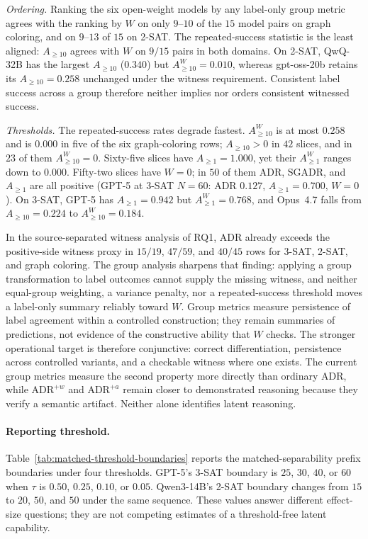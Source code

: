 \documentclass[acmsmall,screen,review,anonymous]{acmart}
\providecommand{\ADRw}{\mathrm{ADR}^{+w}}
\providecommand{\ADRa}{\mathrm{ADR}^{+a}}
\begin{document}
\emph{Ordering.} Ranking the six open-weight models by any label-only group
metric agrees with the ranking by \(W\) on only \(9\)--\(10\) of the \(15\)
model pairs on graph coloring, and on \(9\)--\(13\) of \(15\) on 2-SAT. The
repeated-success statistic is the least aligned: \(A_{\ge10}\) agrees with
\(W\) on \(9/15\) pairs in both domains. On 2-SAT, QwQ-32B has the largest
\(A_{\ge10}\) (\(0.340\)) but \(A^{W}_{\ge10}=0.010\), whereas gpt-oss-20b
retains its \(A_{\ge10}=0.258\) unchanged under the witness requirement.
Consistent label success across a group therefore neither implies nor orders
consistent witnessed success.

\emph{Thresholds.} The repeated-success rates degrade fastest.
\(A^{W}_{\ge10}\) is at most \(0.258\) and is \(0.000\) in five of the six
graph-coloring rows; \(A_{\ge10}>0\) in \(42\) slices, and in \(23\) of them
\(A^{W}_{\ge10}=0\). Sixty-five slices have \(A_{\ge1}=1.000\), yet their
\(A^{W}_{\ge1}\) ranges down to \(0.000\). Fifty-two slices have \(W=0\); in
\(50\) of them ADR, SGADR, and \(A_{\ge1}\) are all positive (GPT-5 at 3-SAT
\(N=60\): ADR \(0.127\), \(A_{\ge1}=0.700\), \(W=0\)). On 3-SAT, GPT-5 has \(A_{\ge1}=0.942\) but \(A^{W}_{\ge1}=0.768\),
and Opus~4.7 falls from \(A_{\ge10}=0.224\) to \(A^{W}_{\ge10}=0.184\).

In the source-separated witness analysis of RQ1, ADR already exceeds the
positive-side witness proxy in \(15/19\), \(47/59\), and \(40/45\) rows for
3-SAT, 2-SAT, and graph coloring. The group analysis sharpens that finding:
applying a group transformation to label outcomes cannot supply the missing
witness, and neither equal-group weighting, a variance penalty, nor a
repeated-success threshold moves a label-only summary reliably toward
\(W\). Group metrics measure persistence of label agreement within a
controlled construction; they remain summaries of predictions, not evidence
of the constructive ability that \(W\) checks. The stronger operational
target is therefore conjunctive: correct differentiation, persistence across
controlled variants, and a checkable witness where one exists. The current
group metrics measure the second property more directly than ordinary ADR,
while \(\ADRw\) and \(\ADRa\) remain closer to demonstrated reasoning because
they verify a semantic artifact. Neither alone identifies latent reasoning.


\paragraph{Reporting threshold.}
Table~\ref{tab:matched-threshold-boundaries} reports the matched-separability
prefix boundaries under four thresholds. GPT-5's 3-SAT boundary is \(25\),
\(30\), \(40\), or \(60\) when \(\tau\) is \(0.50\), \(0.25\),
\(0.10\), or \(0.05\). Qwen3-14B's 2-SAT boundary changes from \(15\) to
\(20\), \(50\), and \(50\) under the same sequence. These values answer
different effect-size questions; they are not competing estimates of a
threshold-free latent capability.
\end{document}

